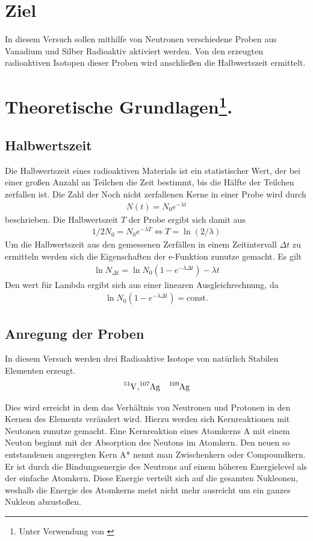 \section{Ziel}
In diesem Versuch sollen mithilfe von Neutronen verschiedene Proben aus Vanadium und Silber
 Radioaktiv aktiviert werden.
Von den erzeugten radioaktiven Isotopen dieser Proben wird anschließen die Halbwertszeit ermittelt.

\section[Theoretische Grundlagen]{Theoretische Grundlagen\footnote[1]{Unter Verwendung von \cite[]{man:v702}}.}

\subsection{Halbwertszeit}
Die Halbwertszeit eines radioaktiven Materials ist ein statistischer Wert, der bei einer großen Anzahl an Teilchen
die Zeit bestimmt, bis die Hälfte der Teilchen zerfallen ist.
Die Zahl der Noch nicht zerfallenen Kerne in einer Probe wird durch 
\begin{align}
    N(t)= N_0 e^{-\lambda t}
\end{align}
beschrieben.
Die Halbwertszeit $T$ der Probe ergibt sich damit aus
\begin{align}
    1/2 N_0 = N_0 e^{-\lambda T} \Leftrightarrow T = \ln(2/\lambda)
    \label{eq:T_aus_lambda}
\end{align}
Um die Halbwertszeit aus den gemessenen Zerfällen in einem Zeitintervall $\Delta t$
zu ermitteln werden sich die Eigenschaften der e-Funktion zunutze gemacht.
Es gilt
\begin{align}
    \ln N_{\Delta t} = \ln{N_0 (1- e^{-\lambda \Delta t})} - \lambda t
    \label{eq:lambda_aus_N}
\end{align}
Den wert für Lambda ergibt sich aus einer linearen Ausgleichrechnung, da
\begin{align*}
    \ln{N_0 (1- e^{-\lambda \Delta t})} = \text{const.}
\end{align*}

\subsection{Anregung der Proben}

In diesem Versuch werden drei Radioaktive Isotope von natürlich Stabilen Elementen erzeugt.
\begin{align}
    \ce{^{51}V}, & \ce{^{107}Ag} & \ce{^{109}Ag}
\end{align}

Dies wird erreicht in dem das Verhältnis von Neutronen und Protonen in den Kernen des Elements verändert wird.
Hierzu werden sich Kernreaktionen mit Neutonen zunutze gemacht.
Eine Kernreaktion eines Atomkerns A mit einem Neuton beginnt mit der Absorption des Neutons im Atomkern.
Den neuen so entstandenen angeregten Kern A* nennt man Zwischenkern oder Compoundkern.
Er ist durch die Bindungsenergie des Neutrons auf einem höheren Energielevel als der einfache Atomkern.
Diese Energie verteilt sich auf die gesamten Nukleonen, weshalb die Energie des Atomkerns meist nicht mehr ausreicht
um ein ganzes Nukleon abzustoßen.